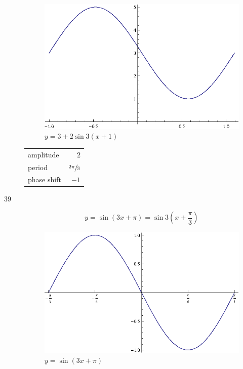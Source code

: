 \documentclass{exam}
\begin{document}
\begin{description}
        \begin{figure}[H]
          \centering
          \includegraphics[scale=1.0]{exercise38.eps}
          \caption{$y = 3 + 2 \sin 3 \left( x + 1 \right)$}
        \end{figure}

        \begin{tabular}[H]{lr}
          \toprule
          amplitude   & $2$ \\
          period      & $\sfrac{2 \pi}{3}$ \\
          phase shift & $-1$ \\
          \bottomrule
        \end{tabular}

      \pagebreak

      \item[39]
        \[
          y = \sin \left( 3x + \pi \right) = \sin 3 \left( x + \frac{\pi}{3} \right) 
        \]

        \begin{figure}[H]
          \centering
          \includegraphics[scale=1.0]{exercise39.eps}
          \caption{$y = \sin \left( 3x + \pi \right)$}
        \end{figure}


\end{description}
\end{document}
